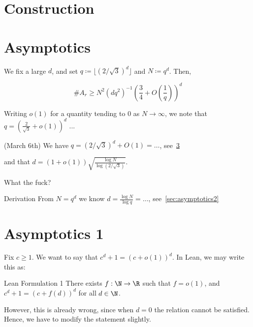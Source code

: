 \documentclass{article}[11px]
\begin{document}
\tableofcontents

\section{Construction}

\pagebreak

\section{Asymptotics}

We fix a large \(d\), and set \(q \coloneqq \lfloor(2 / \sqrt{3})^d\rfloor\) and \(N \coloneqq q^d\). Then,

\[
  \#A_r \geq N^2 (dq^2)^{-1} \left(\frac{3}{4} + O\left(\frac{1}{q}\right)\right)^d
\]

Writing \(o(1)\) for a quantity tending to \(0\) as \(N \to \infty\), we note that \(q = \left(\frac{2}{\sqrt{3}} + o(1)\right)^d\) ...

\begin{theorem}{\ok (March 6th)}{}
We have \(q = (2 / \sqrt{3})^d + O(1) = \ldots\), see~\ref{sec:asymptotics1}
\end{theorem}

and that \(d = (1 + o(1))\sqrt{\frac{\log N}{\log(2 / \sqrt{3})}}\).

\begin{todo}{}{}
What the fuck?
\end{todo}

\begin{theorem}{Derivation}{}
  From \(N = q^d\) we know \(d = \frac{\log N}{\log q} = \ldots\), see~\ref{sec:asymptotics2}
\end{theorem}

\pagebreak

\section{Asymptotics 1}\label{sec:asymptotics1}

Fix \(c \geq 1\). We want to say that \(c^d + 1 = (c + o(1))^d\). In Lean, we may write this as:

\begin{theorem}{Lean Formulation 1}{}\label{thm:3.1}
There exists \(f : \N \to \R\) such that \(f = o(1)\), and \(c^d + 1 = (c + f(d))^d\) for all \(d \in \N\).
\end{theorem}

However, this is already wrong, since when \(d = 0\) the relation cannot be satisfied. Hence, we have to modify the statement slightly.
\end{document}
